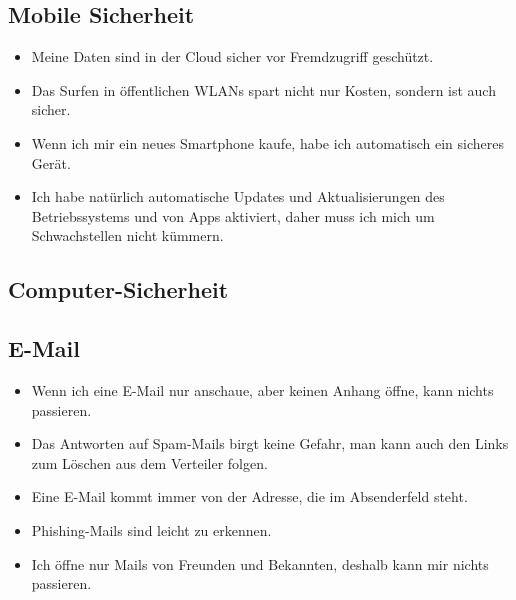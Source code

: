 

\subsection{Mobile Sicherheit}

\begin{frame}
\begin{itemize}
	\item Meine Daten sind in der Cloud sicher vor Fremdzugriff geschützt.
	\item Das Surfen in öffentlichen WLANs spart nicht nur Kosten, sondern ist auch sicher.
	\item Wenn ich mir ein neues Smartphone kaufe, habe ich automatisch ein sicheres Gerät.
	\item Ich habe natürlich automatische Updates und Aktualisierungen des Betriebssystems und von Apps aktiviert, daher muss ich mich um Schwachstellen nicht kümmern.
\end{itemize}
\end{frame}

\subsection{Computer-Sicherheit}


\subsection{E-Mail}

\begin{frame}
\begin{itemize}
	\item Wenn ich eine E-Mail nur anschaue, aber keinen Anhang öffne, kann nichts passieren.
	\item Das Antworten auf Spam-Mails birgt keine Gefahr, man kann auch den Links zum Löschen aus dem Verteiler folgen.
	\item Eine E-Mail kommt immer von der Adresse, die im Absenderfeld steht.
	\item Phishing-Mails sind leicht zu erkennen.
	\item Ich öffne nur Mails von Freunden und Bekannten, deshalb kann mir nichts passieren.
\end{itemize}
\end{frame}

